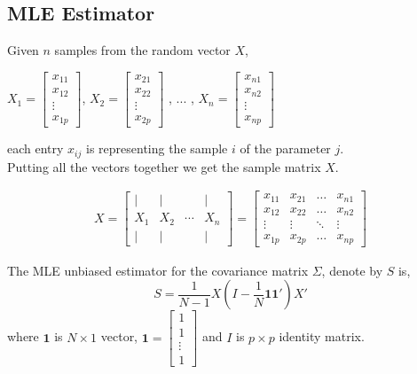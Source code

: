 \documentclass[letterpaper]{article}
\begin{document}
	\subsection{MLE Estimator}

	Given \(n\) samples from the random vector \(X\),
	\begin{center}
	$X_{1} = \begin{bmatrix}x_{11}  \\x_{12}\\ \vdots\\ x_{1p}  \end{bmatrix}$,
	$X_{2} = \begin{bmatrix}x_{21}  \\x_{22}\\ \vdots\\ x_{2p}  \end{bmatrix}$
	, ... ,
	$X_{n} = \begin{bmatrix}x_{n1}  \\x_{n2}\\ \vdots\\ x_{np}  \end{bmatrix}$
	\end{center}
	each entry \(x_{ij}\) is representing the sample \(i\) of the  parameter \(j\). \\
	
	Putting all the vectors together we get the sample matrix \(X\). 
	
	\begin{align*} 
	X = 
	\begin{bmatrix}
	 \mid & \mid &   & \mid \\
	X_{1} & X_{2} & \cdots & X_{n} \\
	 \mid & \mid & & \mid
	\end{bmatrix}
	=
	\begin{bmatrix}
	x_{11} & x_{21} & \dots     & x_{n1} \\
	x_{12} & x_{22} & \dots     & x_{n2} \\
	\vdots  & \vdots  & \ddots  & \vdots  \\
	x_{1p} & x_{2p} & \dots     & x_{np}
	\end{bmatrix}
	\end{align*}
	
	The MLE unbiased estimator for the covariance matrix \(\Sigma\), denote by \(S\) is,  
	\[S = \frac{1}{N-1}X(I - \frac{1}{N}\boldsymbol{1}
	\boldsymbol{1}')X' \]   
	where \(\textbf{1} \)  is \(N \times 1 \) vector,
	$\boldsymbol{1} = \begin{bmatrix}1  \\1\\ \vdots\\ 1  \end{bmatrix}$
	and \(I\) is \(p \times p\) identity matrix.\\
	
\end{document}
